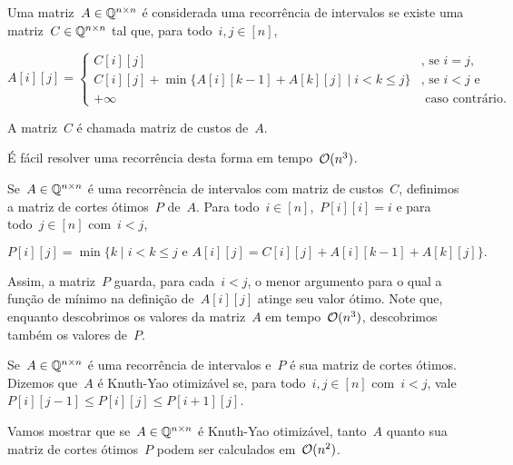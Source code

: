\begin{defi}
Uma matriz~$A \in \mathbb{Q}^{n \times n}$ é considerada uma recorrência de intervalos se existe uma matriz~$C \in \mathbb{Q}^{n \times n}$ tal que, para todo~$i,j \in [n]$,

\begin{equation*}
A[i][j] = \begin{cases}
C[i][j]                                                           & \text{, se } i = j \text{, }  \\
C[i][j] + \min\{A[i][k-1] + A[k][j] \mid i < k \leq j \}          & \text{, se } i < j \text{ e } \\
+\infty                                                           & \text{ caso contrário. }
\end{cases}
\end{equation*}

A matriz~$C$ é chamada matriz de custos de~$A$.
\end{defi}

É fácil resolver uma recorrência desta forma em tempo~$\mathcal{O}(n^3)$. 

\begin{defi}
Se~$A \in \mathbb{Q}^{n \times n}$ é uma recorrência de intervalos com matriz de custos~$C$, definimos a matriz de cortes ótimos~$P$ de~$A$. Para todo~$i \in [n]$,~$P[i][i] = i$ e para todo~$j \in [n]$ com~$i < j$, 

$$P[i][j] = \min\{k \mid i < k \leq j \text{ e } A[i][j] = C[i][j] + A[i][k-1] + A[k][j]\} \text{.}$$
\end{defi}

Assim, a matriz~$P$ guarda, para cada~$i < j$, o menor argumento para o qual a função de mínimo na definição de~$A[i][j]$ atinge seu valor ótimo. Note que, enquanto descobrimos os valores da matriz~$A$ em tempo~$\mathcal{O}(n^3)$, descobrimos também os valores de~$P$.

\begin{defi}
Se~$A \in \mathbb{Q}^{n \times n}$ é uma recorrência de intervalos e~$P$ é sua matriz de cortes ótimos. Dizemos que~$A$ é Knuth-Yao otimizável se, para todo~$i,j \in [n]$ com~$i < j$, vale~${P[i][j-1] \leq P[i][j] \leq P[i+1][j]}$.
\end{defi}

Vamos mostrar que se~$A \in \mathbb{Q}^{n \times n}$ é Knuth-Yao otimizável, tanto~$A$ quanto sua matriz de cortes ótimos~$P$ podem ser calculados em~$\mathcal{O}(n^2)$.


